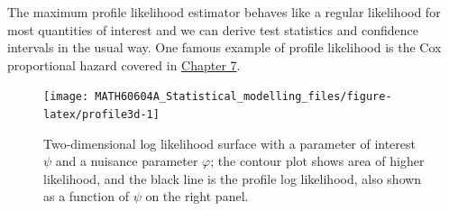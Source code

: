 \documentclass[
  11pt,
  letterpaper,
]{book}
\theoremstyle{definition}
\theoremstyle{definition}
\theoremstyle{definition}
\theoremstyle{definition}
\theoremstyle{remark}
\begin{document}
The maximum profile likelihood estimator behaves like a regular likelihood for most quantities of interest and we can derive test statistics and confidence intervals in the usual way. One famous example of profile likelihood is the Cox proportional hazard covered in \protect\hyperlink{survival}{Chapter 7}.

\begin{figure}

{\centering \texttt{[image: MATH60604A\_Statistical\_modelling\_files/figure-latex/profile3d-1]} 

}

\caption{Two-dimensional log likelihood surface with a parameter of interest $\psi$ and a nuisance parameter $\varphi$; the contour plot shows area of higher likelihood, and the black line is the profile log likelihood, also shown as a function of $\psi$ on the right panel.}\label{fig:profile3d}
\end{figure}
\end{document}

